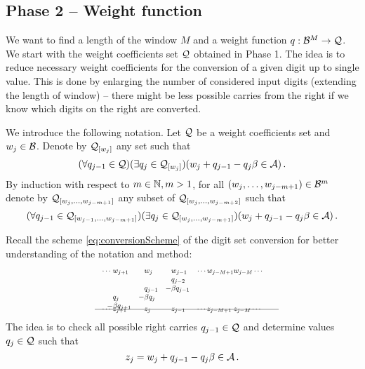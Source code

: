 \begin{upravit}
  
    
    





\section{Phase 2 -- Weight function}
\label{subsec:phase2}
    We want to find a length of the window $M$ and a weight function $q:\mathcal{B}^{M} \to \mathcal{Q}$. We start with the weight coefficients set $\mathcal{Q}$ obtained in Phase 1. The idea is to reduce necessary weight coefficients for the conversion of a given digit up to single value. This is done by enlarging the number of considered input digits (extending the length of window) -- there might be  less possible carries from the right if we know which digits on the right are converted. 
     
    We introduce the following notation. 
        Let $\mathcal{Q}$ be a weight coefficients set and $w_j\in \mathcal{B}$. Denote by $\mathcal{Q}_{[w_j]}$ any set such that
        $$
            (\forall q_{j-1} \in \mathcal{Q})(\exists q_j \in \mathcal{Q}_{[w_j]})(w_j + q_{j-1} - q_j \beta \in \mathcal{A})\,.
        $$
        By induction with respect to $m \in \mathbb{N}, m>1$, for all $(w_{j},\dots, w_{j-m+1})\in \mathcal{B}^{m}$ denote by $\mathcal{Q}_{[w_{j},\dots, w_{j-m+1}]}$ any subset of  $\mathcal{Q}_{[w_{j},\dots, w_{j-m+2}]}$ such that 
        $$
           (\forall q_{j-1} \in \mathcal{Q}_{[w_{j-1},\dots, w_{j-m+1}]})(\exists q_j \in \mathcal{Q}_{[w_{j},\dots, w_{j-m+1}]})(w_j + q_{j-1} - q_j \beta \in \mathcal{A})\,.
        $$
        
    
  
    Recall the scheme \eqref{eq:conversionScheme} of the digit set conversion for better understanding of the notation and method:
    \begin{align*}
        \hspace{130pt}\cdots\; &w_{j+1}&\!\! &w_j  & \!\!  &w_{j-1}&\cdots w_{j-M+1} &w_{j-M}\cdots \hspace{130pt} \\[-3pt] 
                         & &       & & & q_{j-2} \\[-3pt]
                         & &       &q_{j-1}& -&\beta q_{j-1} \\[-3pt]
                           &q_j&   -&\beta q_j &&\\[-3pt]      
                           -&\beta q_{j+1}&   &  &&\\[-15pt]      
    \intertext{\hspace{120pt}\line(1,0){250}} 
          \vspace{-15pt}
          \\[-30pt]
     \cdots\; &z_{j+1}& &z_j& &z_{j-1}& \cdots z_{j-M+1}\; &z_{j-M}\cdots                     
    \end{align*}     
    The idea is to check all possible right carries $q_{j-1}\in\mathcal{Q}$ and determine values $q_j\in\mathcal{Q}$ such that 
    $$
    z_j=w_j + q_{j-1} - q_j \beta \in \mathcal{A} \,.
    $$  
    

\end{upravit}
